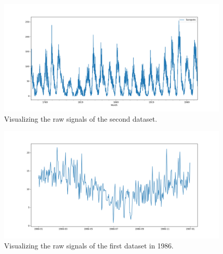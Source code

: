 \documentclass[12pt]{article}
\begin{document}
\begin{enumerate}
\begin{figure}[H]
    \centering
    \begin{minipage}[b]{1\textwidth}
        \includegraphics[width=\textwidth]{figures/Ass1/Ass1_D2_raw_signal.png}
    \end{minipage}
    \caption{Visualizing the raw signals of the second dataset.}
    \label{fig:Ass1_D2_raw_signal}
\end{figure}

\begin{figure}[H]
    \centering
    \begin{minipage}[b]{1\textwidth}
        \includegraphics[width=\textwidth]{figures/Ass1/Ass1_D1_raw_signal_1986.png}
    \end{minipage}
    \caption{Visualizing the raw signals of the first dataset in 1986.}
    \label{fig:Ass1_D1_raw_signal_1986}
\end{figure}


\end{enumerate}
\end{document}
